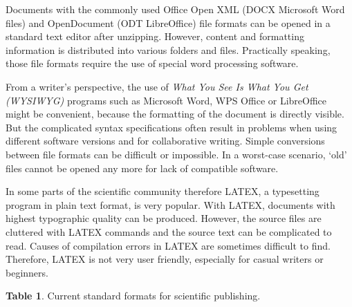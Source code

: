\documentclass[10pt,fleqn]{wlpeerj}
\begin{document}
Documents with the commonly used Office Open XML (DOCX Microsoft Word
files) and OpenDocument (ODT LibreOffice) file formats can be opened in
a standard text editor after unzipping. However, content and formatting
information is distributed into various folders and files. Practically
speaking, those file formats require the use of special word processing
software.

From a writer's perspective, the use of \emph{What You See Is What You
Get (WYSIWYG)} programs such as Microsoft Word, WPS Office or
LibreOffice might be convenient, because the formatting of the document
is directly visible. But the complicated syntax specifications often
result in problems when using different software versions and for
collaborative writing. Simple conversions between file formats can be
difficult or impossible. In a worst-case scenario, `old' files cannot be
opened any more for lack of compatible software.

In some parts of the scientific community therefore LATEX, a typesetting
program in plain text format, is very popular. With LATEX, documents
with highest typographic quality can be produced. However, the source
files are cluttered with LATEX commands and the source text can be
complicated to read. Causes of compilation errors in LATEX are sometimes
difficult to find. Therefore, LATEX is not very user friendly,
especially for casual writers or beginners.

\textbf{Table 1}. Current standard formats for scientific publishing.
\end{document}
